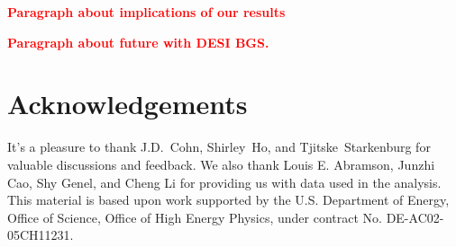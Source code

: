 \documentclass[12pt, letterpaper, preprint, tighten]{aastex62}
\newcommand{\todo}[1]{{\bf \textcolor{red}{#1}}}
\newcommand{\bitem}{\begin{itemize}}
\newcommand{\eitem}{\end{itemize}}
\begin{document}
\todo{Paragraph about implications of our results} 

\todo{Paragraph about future with DESI BGS.}




\section*{Acknowledgements}
It's a pleasure to thank 
    J.D.~Cohn, 
    Shirley~Ho, 
    and 
    Tjitske~Starkenburg 
for valuable discussions and feedback. We also thank Louis E. Abramson, 
Junzhi Cao, Shy Genel, and Cheng Li for providing us with data used in 
the analysis. This material is based upon work supported by the U.S. 
Department of Energy, Office of Science, Office of High Energy Physics, 
under contract No. DE-AC02-05CH11231.



\end{document}
